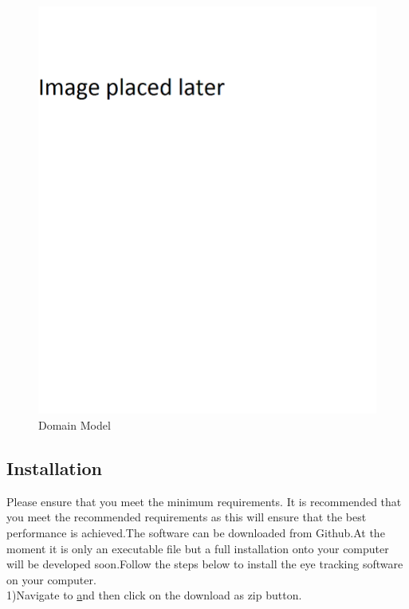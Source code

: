 		\begin{figure}[!ht]
		\centering
		\includegraphics[scale=0.5, width=15cm, keepaspectratio]{./Images/default.png}
		\caption{Domain Model}
		\label{Eyetribe placed on tripod}
	\end{figure}

\subsection{Installation}
Please ensure that you meet the minimum requirements. It is recommended that you meet the recommended requirements as this will ensure that the best performance is achieved.The software can be downloaded from Github.At the moment it is only an executable file but a full installation onto your computer will be developed soon.Follow the steps below to install the eye tracking software on your computer.\\

1)Navigate to \href{https://github.com/MichaelNunes/Neo-Tandem-Tech-Eye-Tracking} and then click on the download as zip button.

